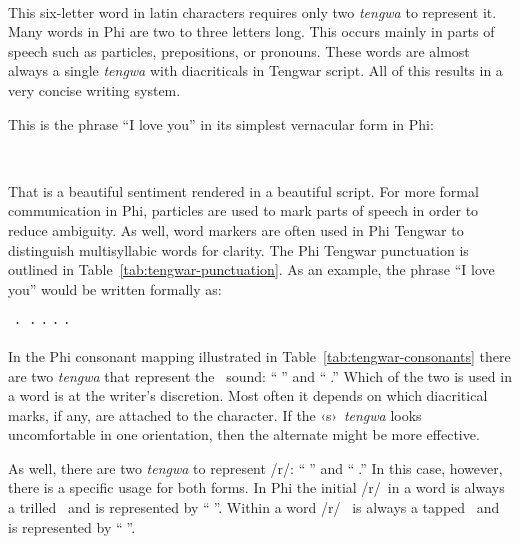 \bigskip
\leftskip=0.66in
\ttlarge 
\normalfont
\bigskip

\leftskip=0in
This six-letter word in latin characters requires only two \emph{tengwa} to
represent it. Many words in Phi are two to three letters long. This occurs
mainly in parts of speech such as particles, prepositions, or pronouns. These
words are almost always a single \emph{tengwa} with diacriticals in Tengwar
script. All of this results in a very concise writing system.

This is the phrase \enquote{I love you} in its simplest vernacular form in Phi:

\bigskip
\leftskip=0.66in
\ttlarge 
\normalfont
\bigskip

\leftskip=0in
That is a beautiful sentiment rendered in a beautiful script. For more formal
communication in Phi, particles are used to mark parts of speech in order to
reduce ambiguity. As well, word markers are often used in Phi Tengwar to
distinguish multisyllabic words for clarity. The Phi Tengwar punctuation is
outlined in Table~\ref{tab:tengwar-punctuation}. As an example, the phrase
\enquote{I love you} would be written formally as:

\bigskip
\leftskip=0.66in
\ttlarge ⸱⸱⸱⸱⸱
\normalfont
\bigskip

\leftskip=0in
In the Phi consonant mapping illustrated in Table~\ref{tab:tengwar-consonants}
there are two \emph{tengwa} that represent the \dscopy [s]~\normalfont sound:
\enquote{\ttcopy \normalfont} and \enquote{\ttcopy \normalfont.} Which of the
two is used in a word is at the writer's discretion. Most often it depends on
which diacritical marks, if any, are attached to the character. If the \dscopy
‹s›~\normalfont \emph{tengwa} looks uncomfortable in one orientation, then the
alternate might be more effective.

As well, there are two \emph{tengwa} to represent \dscopy /r/\normalfont:
\enquote{\ttcopy \normalfont} and \enquote{\ttcopy \normalfont.} In this case,
however, there is a specific usage for both forms. In Phi the initial \dscopy
/r/~\normalfont in a word is always a trilled \dscopy [r]~\normalfont and is
represented by \enquote{\ttcopy \normalfont}. Within a word \dscopy /r/
~\normalfont is always a tapped \dscopy [ɾ]~\normalfont and is represented by
\enquote{\ttcopy \normalfont}.

